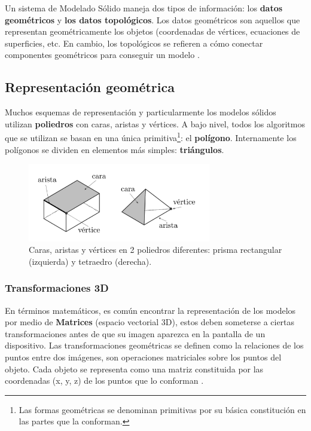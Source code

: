 Un sistema de Modelado Sólido maneja dos tipos de información: los \textbf{datos geométricos} y \textbf{los datos topológicos}. Los datos geométricos son aquellos que representan geométricamente los objetos (coordenadas de vértices, ecuaciones de superficies, etc. En cambio, los topológicos se refieren a cómo conectar componentes geométricos para conseguir un modelo \citep{Ramos2011}.

\subsection{Representación geométrica}
\label{repGeo}

Muchos esquemas de representación y particularmente los modelos sólidos utilizan \textbf{poliedros} \citep{cromwell1999polyhedra} con caras, aristas y vértices.
A bajo nivel, todos los algoritmos que se utilizan se basan en una única primitiva\footnote{Las formas geométricas se denominan  primitivas por su básica constitución en las partes que la conforman.}: el \textbf{polígono}. Internamente los polígonos se dividen en elementos más simples: \textbf{triángulos}.

\begin{figure}[ht]
\includegraphics[width=8cm]{Img/GEO/geo-vertex.jpg}
\centering
\caption{\footnotesize{Caras, aristas y vértices en 2 poliedros diferentes: prisma rectangular (izquierda) y tetraedro (derecha).}}
\end{figure}


\subsubsection{Transformaciones 3D}
En términos matemáticos, es común encontrar la representación de los modelos por medio de \textbf{Matrices} \citep{Gabriela2008} (espacio vectorial 3D), estos deben someterse a ciertas transformaciones antes de que su imagen aparezca en la pantalla de un dispositivo. Las transformaciones geométricas se definen como la relaciones de los puntos entre dos imágenes, son operaciones matriciales sobre los puntos del objeto. Cada  objeto se representa como una matriz constituida por las coordenadas (x, y, z) de los puntos que lo conforman  \citep{villamarin2015}.

